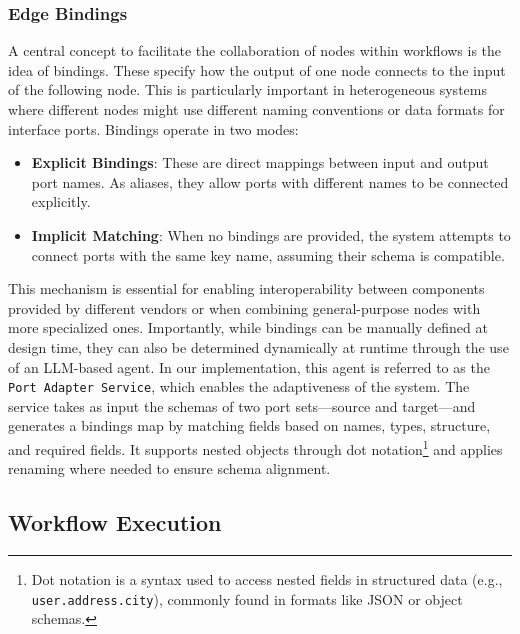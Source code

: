 \subsubsection{Edge Bindings} \label{sec:bindings}
A central concept to facilitate the collaboration of nodes within workflows is the idea of bindings. These specify how the output of one node connects to the input of the following node. This is particularly important in heterogeneous systems where different nodes might use different naming conventions or data formats for interface ports. Bindings operate in two modes:

\begin{itemize}[leftmargin=*, label=--]
    \item \textbf{Explicit Bindings}: These are direct mappings between input and output port names. As aliases, they allow ports with different names to be connected explicitly.
    \item \textbf{Implicit Matching}: When no bindings are provided, the system attempts to connect ports with the same key name, assuming their schema is compatible. 
\end{itemize}


This mechanism is essential for enabling interoperability between components provided by different vendors or when combining general-purpose nodes with more specialized ones. Importantly, while bindings can be manually defined at design time, they can also be determined dynamically at runtime through the use of an LLM-based agent. In our implementation, this agent is referred to as the \texttt{Port Adapter Service}, which enables the adaptiveness of the system. The service takes as input the schemas of two port sets—source and target—and generates a bindings map by matching fields based on names, types, structure, and required fields. It supports nested objects through dot notation\footnote{Dot notation is a syntax used to access nested fields in structured data (e.g., \texttt{user.address.city}), commonly found in formats like JSON or object schemas.} and applies renaming where needed to ensure schema alignment.




\subsection{Workflow Execution} \label{sec:execution}

